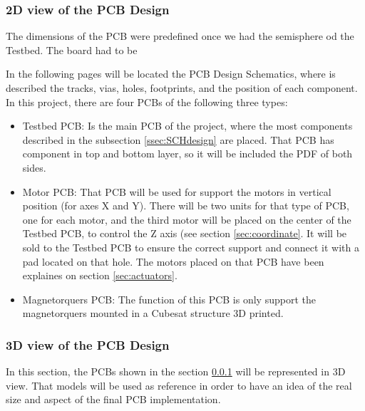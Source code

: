 \subsubsection{2D view of the \acrshort{PCB} Design} \label{sssec:2Ddesign}
The dimensions of the PCB were predefined once we had the semisphere od the Testbed. The board had to be 

In the following pages will be located the \acrshort{PCB} Design Schematics, where is described the tracks, vias, holes, footprints, and the position of each component. In this project, there are four \acrshort{PCB}s of the following three types:

\begin{itemize}
\item Testbed \acrshort{PCB}: Is the main \acrshort{PCB} of the project, where the most components described in the subsection \ref{ssec:SCHdesign} are placed. That PCB has component in top and bottom layer, so it will be included the PDF of both sides.
\item Motor \acrshort{PCB}: That \acrshort{PCB} will be used for support the motors in vertical position (for axes X and Y). There will be two units for that type of \acrshort{PCB}, one for each motor, and the third motor will be placed on the center of the Testbed \acrshort{PCB}, to control the Z axis (see section \ref{sec:coordinate}. It will be sold to the Testbed \acrshort{PCB} to ensure the correct support and connect it with a pad located on that hole. The motors placed on that \acrshort{PCB} have been explaines on section \ref{sec:actuators}. 
\item Magnetorquers \acrshort{PCB}: The function of this \acrshort{PCB} is only support the magnetorquers mounted in a Cubesat structure 3D printed.

\end{itemize}








\subsubsection{3D view of the \acrshort{PCB} Design} \label{sssec:3Ddesign}

In this section, the \acrshort{PCB}s shown in the section \ref{sssec:2Ddesign} will be represented in 3D view. That models will be used as reference in order to have an idea of the real size and aspect of the final \acrshort{PCB} implementation. 

